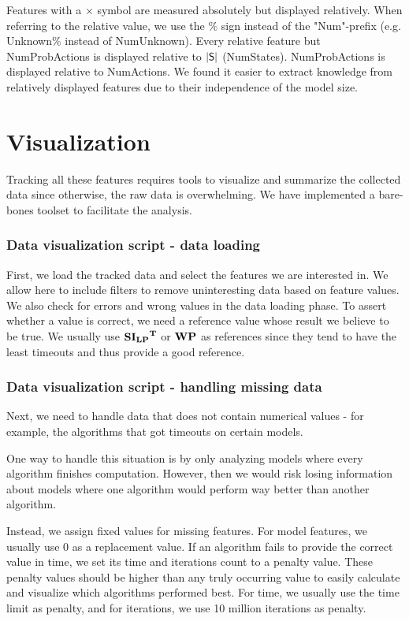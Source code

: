 Features with a $\times$ symbol are measured absolutely but displayed relatively. 
When referring to the relative value, we use the $\%$ sign instead of the "Num"-prefix (e.g. Unknown\% instead of NumUnknown).
Every relative feature but NumProbActions is displayed relative to $|\mathsf{S}|$ (NumStates). NumProbActions is displayed relative to NumActions.
We found it easier to extract knowledge from relatively displayed features due to their independence of the model size. 

\section*{Visualization}

Tracking all these features requires tools to visualize and summarize the collected data since otherwise, the raw data is overwhelming.
We have implemented a bare-bones toolset to facilitate the analysis. 

\subsubsection*{Data visualization script - data loading}
First, we load the tracked data and select the features we are interested in. We allow here to include filters to remove uninteresting data based on feature values.
We also check for errors and wrong values in the data loading phase. To assert whether a value is correct, we need a reference value whose result we believe to be true.
We usually use $\mathbf{\mathbf{SI_{LP}}^T}$ or $\mathbf{WP}$ as references since they tend to have the least timeouts and thus provide a good reference.

\subsubsection*{Data visualization script - handling missing data}
Next, we need to handle data that does not contain numerical values - for example, the algorithms that got timeouts on certain models.

One way to handle this situation is by only analyzing models where every algorithm finishes computation.
However, then we would risk losing information about models where one algorithm would perform way better than another algorithm.

Instead, we assign fixed values for missing features. For model features, we usually use 0 as a replacement value. 
If an algorithm fails to provide the correct value in time, we set its time and iterations count to a penalty value.
These penalty values should be higher than any truly occurring value to easily calculate and visualize which algorithms performed best.
For time, we usually use the time limit as penalty, and for iterations, we use 10 million iterations as penalty.

